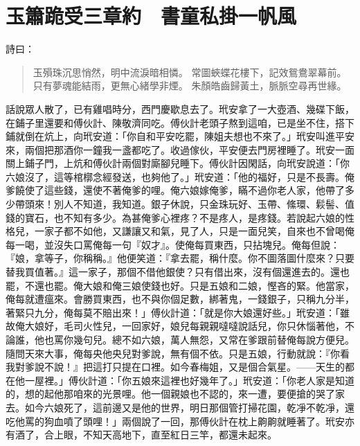 
\chapter{玉簫跪受三章約　書童私掛一帆風}

詩曰：
\begin{quote}
玉殞珠沉思悄然，明中流淚暗相憐。
常圖蛺蝶花樓下，記效鴛鴦翠幕前。
只有夢魂能結雨，更無心緒學非煙。
朱顏皓齒歸黃土，脈脈空尋再世緣。
\end{quote}

話說眾人散了，已有雞唱時分，西門慶歇息去了。玳安拿了一大壺酒、幾碟下飯，在鋪子里還要和傅伙計、陳敬濟同吃。傅伙計老頭子熬到這咱，已是坐不住，搭下鋪就倒在炕上，向玳安道：「你自和平安吃罷，陳姐夫想也不來了。」玳安叫進平安來，兩個把那酒你一鐘我一盞都吃了。收過傢伙，平安便去門房裡睡了。玳安一面關上鋪子門，上炕和傅伙計兩個對廝腳兒睡下。傅伙計因閑話，向玳安說道：「你六娘沒了，這等棺槨念經發送，也夠他了。」玳安道：「他的福好，只是不長壽。俺爹饒使了這些錢，還使不著俺爹的哩。俺六娘嫁俺爹，瞞不過你老人家，他帶了多少帶頭來！別人不知道，我知道。銀子休說，只金珠玩好、玉帶、絛環、鬏髻、值錢的寶石，也不知有多少。為甚俺爹心裡疼？不是疼人，是疼錢。若說起六娘的性格兒，一家子都不如他，又謙讓又和氣，見了人，只是一面兒笑，自來也不曾喝俺每一喝，並沒失口罵俺每一句『奴才』。使俺每買東西，只拈塊兒。俺每但說：『娘，拿等子，你稱稱。』他便笑道：『拿去罷，稱什麼。你不圖落圖什麼來？只要替我買值著。』這一家子，那個不借他銀使？只有借出來，沒有個還進去的。還也罷，不還也罷。俺大娘和俺三娘使錢也好。只是五娘和二娘，慳吝的緊。他當家，俺每就遭瘟來。會勝買東西，也不與你個足數，綁著鬼，一錢銀子，只稱九分半，著緊只九分，俺每莫不賠出來！」傅伙計道：「就是你大娘還好些。」玳安道：「雖故俺大娘好，毛司火性兒，一回家好，娘兒每親親噠噠說話兒，你只休惱著他，不論誰，他也罵你幾句兒。總不如六娘，萬人無怨，又常在爹跟前替俺每說方便兒。隨問天來大事，俺每央他央兒對爹說，無有個不依。只是五娘，行動就說：『你看我對爹說不說！』把這打只提在口裡。如今春梅姐，又是個合氣星。——天生的都在他一屋裡。」傅伙計道：「你五娘來這裡也好幾年了。」玳安道：「你老人家是知道的，想的起他那咱來的光景哩。他一個親娘也不認的，來一遭，要便搶的哭了家去。如今六娘死了，這前邊又是他的世界，明日那個管打掃花園，乾凈不乾凈，還吃他罵的狗血噴了頭哩！」兩個說了一回，那傅伙計在枕上齁齁就睡著了。玳安亦有酒了，合上眼，不知天高地下，直至紅日三竿，都還未起來。

